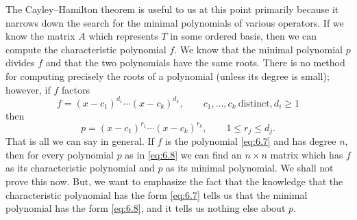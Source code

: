 The Cayley--Hamilton theorem is useful to us at this point primarily because it narrows down the search for the minimal polynomials of various operators. If we know the matrix \(A\) which represents \(T\) in some ordered basis, then we can compute the characteristic polynomial \(f\). We know that the minimal polynomial \(p\) divides \(f\) and that the two polynomials have the same roots. There is no method for computing precisely the roots of a polynomial (unless its degree is small); however, if \(f\) factors
\begin{equation}
    f=\left(x-c_1\right)^{d_1}\cdots\left(x-c_k\right)^{d_k},\qquad c_1,\ldots,c_k~\text{distinct},d_i\geqslant1\label{eq:6.7}
\end{equation}
then
\begin{equation}
    p=\left(x-c_1\right)^{r_1}\cdots\left(x-c_k\right)^{r_k},\qquad1\leqslant r_j\leqslant d_j.\label{eq:6.8}
\end{equation}
That is all we can say in general. If \(f\) is the polynomial \eqref{eq:6.7} and has degree \(n\), then for every polynomial \(p\) as in \eqref{eq:6.8} we can find an \(n\times n\) matrix which has \(f\) as its characteristic polynomial and \(p\) as its minimal polynomial. We shall not prove this now. But, we want to emphasize the fact that the knowledge that the characteristic polynomial has the form \eqref{eq:6.7} tells us that the minimal polynomial has the form \eqref{eq:6.8}, and it tells us nothing else about \(p\).


